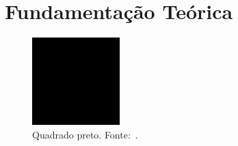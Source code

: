 \chapter{Fundamentação Teórica}%
\label{cap:fundamentacao}

\begin{figure}[!ht]%
    \centering
    \includegraphics[scale=0.5]{imagens/black-square.png}
    \caption{Quadrado preto. Fonte:~\cite{tortinhas:2024}.}%
    \label{fig:f1}
\end{figure}

\lipsum[1-20] %
